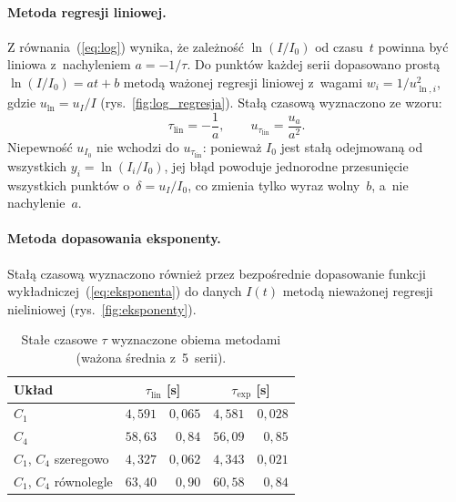 \documentclass[12pt, a4paper]{article}
\begin{document}
\paragraph{Metoda regresji liniowej.}
Z równania~(\ref{eq:log}) wynika, że zależność $\ln(I/I_0)$ od czasu~$t$ powinna
być liniowa z~nachyleniem $a = -1/\tau$. Do punktów każdej serii dopasowano prostą
$\ln(I/I_0) = at + b$ metodą ważonej regresji liniowej z~wagami
$w_i = 1/u_{\ln,i}^2$, gdzie $u_{\ln} = u_I/I$ (rys.~\ref{fig:log_regresja}).
Stałą czasową wyznaczono ze wzoru:
\begin{equation}
    \tau_\text{lin} = -\frac{1}{a}, \qquad
    u_{\tau_\text{lin}} = \frac{u_a}{a^2}.
    \label{eq:tau_lin}
\end{equation}
Niepewność $u_{I_0}$ nie wchodzi do $u_{\tau_\text{lin}}$: ponieważ $I_0$ jest
stałą odejmowaną od wszystkich $y_i = \ln(I_i/I_0)$, jej błąd powoduje
jednorodne przesunięcie wszystkich punktów o~$\delta = u_I/I_0$, co zmienia
tylko wyraz wolny~$b$, a~nie nachylenie~$a$.

\paragraph{Metoda dopasowania eksponenty.}
Stałą czasową wyznaczono również przez bezpośrednie dopasowanie funkcji
wykładniczej~(\ref{eq:eksponenta}) do danych $I(t)$ metodą nieważonej regresji
nieliniowej (rys.~\ref{fig:eksponenty}).

\begin{table}[H]
\centering
\caption{Stałe czasowe $\tau$ wyznaczone obiema metodami (ważona średnia z~5~serii).}\label{tab:tau}
\begin{tabular}{l r @{\;$\pm$\;} r r @{\;$\pm$\;} r}
\toprule
Układ & \multicolumn{2}{c}{$\tau_\text{lin}$ [s]} & \multicolumn{2}{c}{$\tau_\text{exp}$ [s]} \\
\midrule
$C_1$                   & $4{,}591$ & $0{,}065$ & $4{,}581$ & $0{,}028$ \\
$C_4$                   & $58{,}63$ & $0{,}84$  & $56{,}09$ & $0{,}85$  \\
$C_1$, $C_4$ szeregowo  & $4{,}327$ & $0{,}062$ & $4{,}343$ & $0{,}021$ \\
$C_1$, $C_4$ równolegle & $63{,}40$ & $0{,}90$  & $60{,}58$ & $0{,}84$  \\
\bottomrule
\end{tabular}
\end{table}
\end{document}
